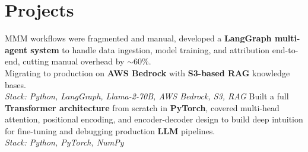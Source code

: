 \section{Projects}
  \resumeSubHeadingListStart
      {MMM workflows were fragmented and manual, developed a \textbf{LangGraph multi-agent system} to handle data ingestion, model training, and attribution end-to-end, cutting manual overhead by $\sim$60\%. \\
      Migrating to production on \textbf{AWS Bedrock} with \textbf{S3-based RAG} knowledge bases. \\
      \textit{Stack: Python, LangGraph, Llama-2-70B, AWS Bedrock, S3, RAG}}
      {Built a full \textbf{Transformer architecture} from scratch in \textbf{PyTorch}, covered multi-head attention, positional encoding, and encoder-decoder design to build deep intuition for fine-tuning and debugging production \textbf{LLM} pipelines. \\
      \textit{Stack: Python, PyTorch, NumPy}}
  \resumeSubHeadingListEnd